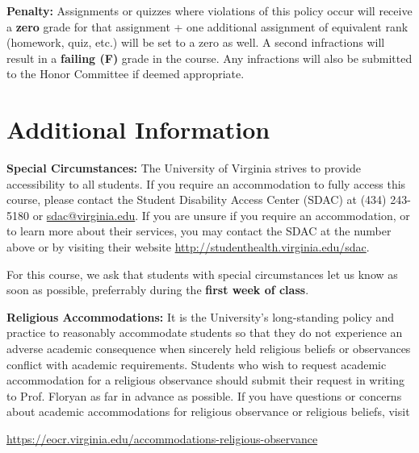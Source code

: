 \documentclass[12pt]{article}
\begin{document}
\textbf{Penalty:} Assignments or quizzes where violations of this policy occur will receive a \textbf{zero} grade for that assignment + one additional assignment of equivalent rank (homework, quiz, etc.) will be set to a zero as well. A second infractions will result in a \textbf{failing (F)} grade in the course.  Any infractions will also be submitted to the Honor Committee if deemed appropriate.

\section*{Additional Information}


\textbf{Special Circumstances:} The University of Virginia strives to provide accessibility to all students. If you require an accommodation to fully access this course, please contact the Student Disability Access Center (SDAC) at (434) 243-5180 or \url{sdac@virginia.edu}. If you are unsure if you require an accommodation, or to learn more about their services, you may contact the SDAC at the number above or by visiting their website \url{http://studenthealth.virginia.edu/sdac}.

For this course, we ask that students with special circumstances let us know as soon as possible, preferrably during the \textbf{first week of class}.

\textbf{Religious Accommodations:} It is the University's long-standing policy and practice to reasonably accommodate students so that they do not experience an adverse academic consequence when sincerely held religious beliefs or observances conflict with academic requirements.  Students who wish to request academic accommodation for a religious observance should submit their request in writing to Prof. Floryan as far in advance as possible. If you have questions or concerns about academic accommodations for religious observance or religious beliefs, visit 

\begin{center} 
    \url{https://eocr.virginia.edu/accommodations-religious-observance}
\end{center}
\end{document}
